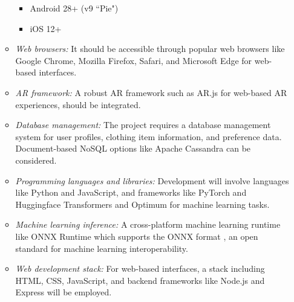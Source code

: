 \begin{enumerate}
\begin{itemize}
\begin{itemize}
							\item Android 28+ (v9 ``Pie")
							\item iOS 12+
						\end{itemize}
					\item \textit{Web browsers:} It should be accessible through popular web browsers like Google Chrome, Mozilla Firefox, Safari, and Microsoft Edge for web-based interfaces.
					\item \textit{AR framework:} A robust AR framework such as AR.js for web-based AR experiences, should be integrated.
					\item \textit{Database management:} The project requires a database management system for user profiles, clothing item information, and preference data. Document-based NoSQL options like Apache Cassandra can be considered.
					\item \textit{Programming languages and libraries:} Development will involve languages like Python and JavaScript, and frameworks like PyTorch and Huggingface Transformers and Optimum for machine learning tasks.
					\item \textit{Machine learning inference:} A cross-platform machine learning runtime like ONNX Runtime \cite{onnxruntimeONNXRuntime} which supports the ONNX format \cite{onnxONNXHome}, an open standard for machine learning interoperability.
					\item \textit{Web development stack:} For web-based interfaces, a stack including HTML, CSS, JavaScript, and backend frameworks like Node.js and Express will be employed.
				\end{itemize}
		\end{enumerate}
	
